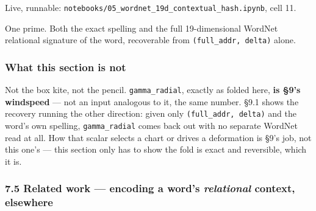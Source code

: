 \documentclass[
  10pt,
]{article}
\begin{document}
Live, runnable:
\texttt{notebooks/05\_wordnet\_19d\_contextual\_hash.ipynb}, cell 11.

One prime. Both the exact spelling and the full 19-dimensional WordNet
relational signature of the word, recoverable from
\texttt{(full\_addr,\ delta)} alone.

\hypertarget{what-this-section-is-not}{%
\subsubsection{What this section is
not}\label{what-this-section-is-not}}

Not the box kite, not the pencil. \texttt{gamma\_radial}, exactly as
folded here, \textbf{is §9's windspeed} --- not an input analogous to
it, the same number. §9.1 shows the recovery running the other
direction: given only \texttt{(full\_addr,\ delta)} and the word's own
spelling, \texttt{gamma\_radial} comes back out with no separate WordNet
read at all. How that scalar selects a chart or drives a deformation is
§9's job, not this one's --- this section only has to show the fold is
exact and reversible, which it is.

\hypertarget{related-work-encoding-a-words-relational-context-elsewhere}{%
\subsubsection{\texorpdfstring{7.5 Related work --- encoding a word's
\emph{relational} context,
elsewhere}{7.5 Related work --- encoding a word's relational context, elsewhere}}\label{related-work-encoding-a-words-relational-context-elsewhere}}
\end{document}
